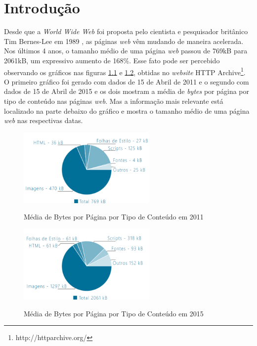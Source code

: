 %
%

\chapter{Introdução}\label{chap:introducao}

Desde que a \textit{World Wide Web} foi proposta pelo cientista e pesquisador britânico Tim Bernes-Lee em 1989 \cite{WebHistory}, as páginas \textit{web} vêm mudando de maneira acelerada. Nos últimos 4 anos, o tamanho médio de uma página \textit{web} passou de 769kB para 2061kB, um expressivo aumento de 168\%. Esse fato pode ser percebido observando os gráficos nas figuras \ref{fig:httpcontenttype2011} e \ref{fig:httpcontenttype2015}, obtidas no \textit{website} HTTP Archive\footnote{http://httparchive.org/}. O primeiro gráfico foi gerado com dados de 15 de Abril de 2011 e o segundo com dados de 15 de Abril de 2015 e os dois mostram a média de \textit{bytes} por página por tipo de conteúdo nas páginas \textit{web}. Mas a informação mais relevante está localizado na parte debaixo do gráfico e mostra o tamanho médio de uma página \textit{web} nas respectivas datas.

\begin{figure}[!htb]
    \centering
    \caption{Média de Bytes por Página por Tipo de Conteúdo em 2011}
    \includegraphics[width=0.6\textwidth]{./04-figuras/introducao/bytes_content_type_april_2011}
    \label{fig:httpcontenttype2011}
\end{figure}

\begin{figure}[!htb]
    \centering
    \caption{Média de Bytes por Página por Tipo de Conteúdo em 2015}
    \includegraphics[width=0.6\textwidth]{./04-figuras/introducao/bytes_content_type_april_2015}
    \label{fig:httpcontenttype2015}
\end{figure}


